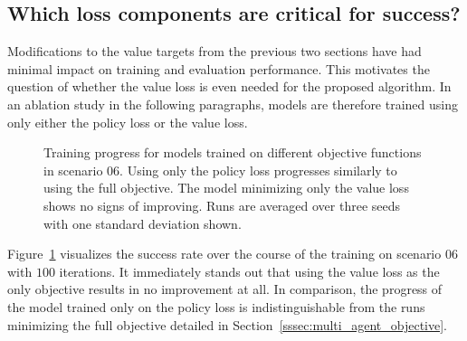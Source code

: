 \subsection{Which loss components are critical for success?}\label{ssec:eval_of_loss}
Modifications to the value targets from the previous two sections have had minimal impact on training and evaluation performance. This motivates the question of whether the value loss is even needed for the proposed algorithm. In an ablation study in the following paragraphs, models are therefore trained using only either the policy loss or the value loss.

\begin{figure}[h]
	\centering
	\captionsetup{justification=centering}
	\scalebox{0.9}{
    
    }
	\caption[Training progress for different losses]{Training progress for models trained on different objective functions in scenario 06. Using only the policy loss progresses similarly to using the full objective. The model minimizing only the value loss shows no signs of improving. Runs are averaged over three seeds with one standard deviation shown.}
\label{fig:train_success_loss}
\end{figure}
Figure~\ref{fig:train_success_loss} visualizes the success rate over the course of the training on scenario 06 with $100$ iterations. It immediately stands out that using the value loss as the only objective results in no improvement at all. In comparison, the progress of the model trained only on the policy loss is indistinguishable from the runs minimizing the full objective detailed in Section~\ref{sssec:multi_agent_objective}.

